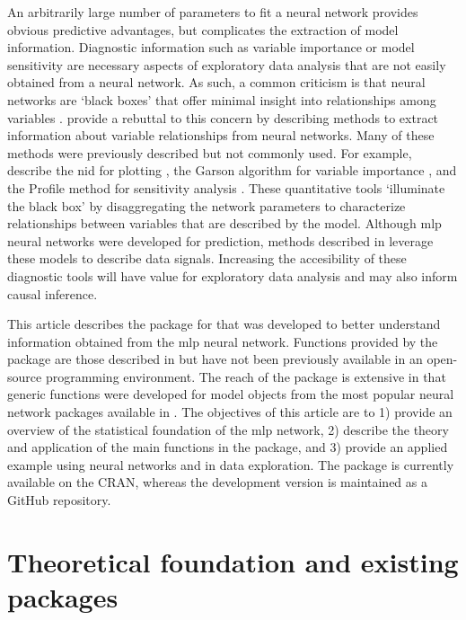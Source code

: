 \documentclass[article,shortnames]{jss}
\begin{document}
An arbitrarily large number of parameters to fit a neural network provides obvious predictive advantages, but complicates the extraction of model information.  Diagnostic information such as variable importance or model sensitivity are necessary aspects of exploratory data analysis that are not easily obtained from a neural network. As such, a common criticism is that neural networks are `black boxes' that offer minimal insight into relationships among variables \citep[e.g.,][]{Paruelo97}.  \citet{Olden02} provide a rebuttal to this concern by describing methods to extract information about variable relationships from neural networks.  Many of these methods were previously described but not commonly used.  For example, \citet{Olden02} describe  the \ac{nid} for plotting \citep{Ozesmi99}, the Garson algorithm for variable importance \citep{Garson91}, and the Profile method for sensitivity analysis \citep{Lek96}.  These quantitative tools `illuminate the black box' by disaggregating the network parameters to characterize relationships between variables that are described by the model.  Although \ac{mlp} neural networks were developed for prediction, methods described in \citet{Olden02} leverage these models to describe data signals.  Increasing the accesibility of these diagnostic tools will have value for exploratory data analysis and may also inform causal inference.

This article describes the  package for  that was developed to better understand information obtained from the \ac{mlp} neural network.  Functions provided by the package are those described in \citet{Olden02} but have not been previously available in an open-source programming environment.  The reach of the package is extensive in that generic functions were developed for model objects from the most popular neural network packages available in .  The objectives of this article are to 1) provide an overview of the statistical foundation of the \ac{mlp} network, 2) describe the theory and application of the main functions in the  package, and 3) provide an applied example using neural networks and  in data exploration.  The package is currently available on the \ac{CRAN}, whereas the development version is maintained as a GitHub repository.  

\section[Theoretical foundation]{Theoretical foundation and existing  packages}
\end{document}

